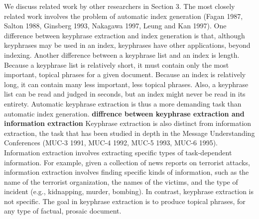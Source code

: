 We discuss related work by other researchers in Section 3. The most closely related work involves the problem of automatic index generation (Fagan 1987, Salton 1988, Ginsberg 1993, Nakagawa 1997, Leung and Kan 1997). One difference between keyphrase extraction and index generation is that, although keyphrases may be used in an index, keyphrases have other applications, beyond indexing. Another difference between a keyphrase list and an index is length. Because a keyphrase list is relatively short, it must contain only the most important, topical phrases for a given document. Because an index is relatively long, it can contain many less important, less topical phrases. Also, a keyphrase list can be read and judged in seconds, but an index might never be read in its entirety. Automatic keyphrase extraction is thus a more demanding task than automatic index generation. \cite{turney2000}
\textbf{diffrence between keyphrase extraction and information extraction}
Keyphrase extraction is also distinct from information extraction, the task that has been studied in depth in the Message Understanding Conferences (MUC-3 1991, MUC-4 1992, MUC-5 1993, MUC-6 1995). Information extraction involves extracting specific types of task-dependent information. For example, given a collection of news reports on terrorist attacks, information extraction involves finding specific kinds of information, such as the name of the terrorist organization, the names of the victims, and the type of incident (e.g., kidnapping, murder, bombing). In contrast, keyphrase extraction is not specific. The goal in keyphrase extraction is to produce topical phrases, for any type of factual, prosaic document. \cite{turney2000}


